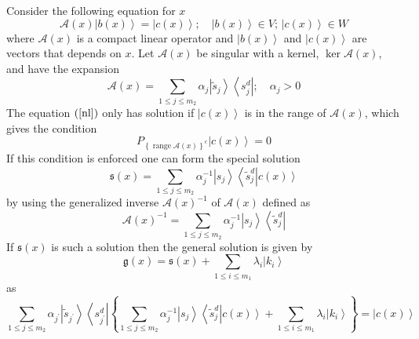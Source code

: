 \documentclass[aps,preprint]{revtex4}%
\begin{document}
Consider the following equation for $x$
\begin{equation}
\mathcal{A}\left(  x\right)  \left|  b\left(  x\right)  \right\rangle =\left|
c\left(  x\right)  \right\rangle ;\quad\left|  b\left(  x\right)
\right\rangle \in V;\,\left|  c\left(  x\right)  \right\rangle \in W\label{nl}%
\end{equation}
where $\mathcal{A}\left(  x\right)  $ is a compact linear operator and
$\left|  b\left(  x\right)  \right\rangle $ and $\left|  c\left(  x\right)
\right\rangle $ are vectors that depends on $x.$ Let $\mathcal{A}\left(
x\right)  $ be singular with a kernel, $\ker\mathcal{A}\left(  x\right)  $,
and have the expansion
\begin{equation}
\mathcal{A}\left(  x\right)  =\sum_{1\leq j\leq m_{2}}\alpha_{j}\left|
\tilde{s}_{j}\right\rangle \left\langle s_{j}^{d}\right|  ;\quad\alpha_{j}>0
\end{equation}
The equation $\left(  \ref{nl}\right)  $ only has solution if $\left|
c\left(  x\right)  \right\rangle $ is in the range of $\mathcal{A}\left(
x\right)  $, which gives the condition
\begin{equation}
P_{\left\{  \operatorname{range}\mathcal{A}\left(  x\right)  \right\}  ^{c}%
}\left|  c\left(  x\right)  \right\rangle =0
\end{equation}
If this condition is enforced one can form the special solution
\begin{equation}
\mathfrak{s}\left(  x\right)  =\sum_{1\leq j\leq m_{2}}\alpha_{j}^{-1}\left|
s_{j}\right\rangle \left\langle \tilde{s}_{j}^{d}\right|  \left.  c\left(
x\right)  \right\rangle
\end{equation}
by using the generalized inverse $\mathcal{A}\left(  x\right)  ^{-1}$ of
$\mathcal{A}\left(  x\right)  $ defined as
\begin{equation}
\mathcal{A}\left(  x\right)  ^{-1}=\sum_{1\leq j\leq m_{2}}\alpha_{j}%
^{-1}\left|  s_{j}\right\rangle \left\langle \tilde{s}_{j}^{d}\right|
\end{equation}
If $\mathfrak{s}\left(  x\right)  $ is such a solution then the general
solution is given by
\begin{equation}
\mathfrak{g}\left(  x\right)  =\mathfrak{s}\left(  x\right)  +\sum_{1\leq
i\leq m_{1}}\lambda_{i}\left|  k_{i}\right\rangle
\end{equation}
as
\begin{equation}
\sum_{1\leq j\leq m_{2}}\alpha_{j^{\prime}}\left|  \tilde{s}_{j^{\prime}%
}\right\rangle \left\langle s_{j^{\prime}}^{d}\right|  \left\{  \sum_{1\leq
j\leq m_{2}}\alpha_{j}^{-1}\left|  s_{j}\right\rangle \left\langle \tilde
{s}_{j}^{d}\right|  \left.  c\left(  x\right)  \right\rangle +\sum_{1\leq
i\leq m_{1}}\lambda_{i}\left|  k_{i}\right\rangle \right\}  =\left|  c\left(
x\right)  \right\rangle
\end{equation}
\end{document}
